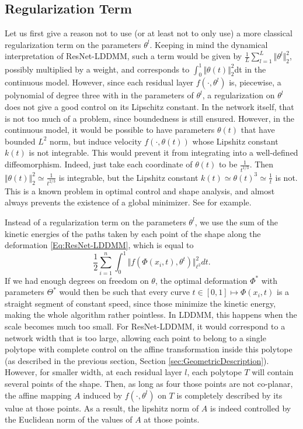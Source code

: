 
\subsection{Regularization Term}
\label{sec:GeometricRegularization}

Let us first give a reason not to use (or at least not to only use) a more classical regularization term on the parameters $\theta^l$. Keeping in mind the dynamical interpretation of ResNet-LDDMM, such a term would be given by $\frac{1}{L}\sum_{l=1}^L\Vert\theta^l\Vert^2_{2}$, possibly multiplied by a weight, and corresponds to $\int_0^1\Vert\theta(t)\Vert^2_{2}$dt in the continuous model. However, since each residual layer $f(\cdot,\theta^l)$ is, piecewise, a polynomial of degree three with in the parameters of $\theta^l$, a regularization on $\theta^l$ does not give a good control on its Lipschitz constant. In the network itself, that is not too much of a problem, since boundedness is still ensured. However, in the continuous model, it would be possible to have parameters $\theta(t)$ that have bounded $L^2$ norm, but induce velocity $f(\cdot,\theta(t))$ whose Lipshitz constant $k(t)$ is not integrable. This would prevent it from integrating  into a well-defined diffeomorphism. Indeed, just take each coordinate of $\theta(t)$ to be $\frac{1}{t^{1/3}}$. Then $\Vert\theta(t)\Vert^2_{2}\simeq \frac{1}{t^{2/3}}$ is integrable, but the Lipshitz constant $k(t)\simeq\theta(t)^3\simeq\frac{1}{t}$ is not. This is a known problem in optimal control and shape analysis, and almost always prevents the existence of a global minimizer. See \cite{mumford2006riemannian} for example.

Instead of a regularization term on the parameters $\theta^l$, we use the sum of the kinetic energies of the paths taken by each point of the shape along the deformation \eqref{Eq:ResNet-LDDMM}, which is equal to
$$
\frac{1}{2}\sum_{i=1}^n\int_0^1\Vert f(\Phi(x_i,t),\theta^t)\Vert_{\ell^2}^2dt.
$$
If we had enough degrees on freedom on $\theta$, the optimal deformation $\Phi^*$ with parameters $\Theta^*$ would then be such that every  curve $t\in[0,1]\mapsto \Phi(x_i,t)$ is a straight segment of constant speed, since those minimize the kinetic energy, making the whole algorithm rather pointless. In LDDMM, this happens when the scale becomes much too small. For ResNet-LDDMM, it would correspond to a network width that is too large, allowing each point to belong to a single polytope  with complete control on the affine transformation inside this polytope (as described in the previous section, Section \ref{sec:GeometricDescription}). However, for smaller width, at each residual layer $l$, each polytope $T$ will contain several points of the shape. Then, as long as four those points are not co-planar, the affine mapping $A$ induced by $f(\cdot,\theta^l)$ on $T$ is completely described by its value at those points. As a result, the lipshitz norm of $A$ is indeed controlled by the Euclidean norm of the values of $A$ at those points.





